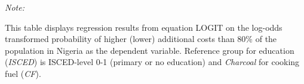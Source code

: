 \begin{table}[htbp!]
\begin{adjustbox}{width = 1\textwidth, max height = 0.95\textheight, center}
\begin{threeparttable}[b]
         \begin{tablenotes}\item \medskip \textit{Note:}
            \item This table displays regression results from equation LOGIT on the log-odds transformed probability of higher (lower) additional costs than 80\% of the population in Nigeria as the dependent variable. Reference group for education (\textit{ISCED}) is ISCED-level 0-1 (primary or no education) and \textit{Charcoal} for cooking fuel (\textit{CF}).
         \end{tablenotes}
      \end{threeparttable}
   \end{adjustbox}
\end{table}


